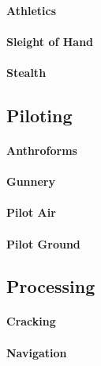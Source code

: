 \paragraph{Athletics}

\paragraph{Sleight of Hand}

\paragraph{Stealth}


\subsection{Piloting}

\paragraph{Anthroforms}

\paragraph{Gunnery}

\paragraph{Pilot Air}

\paragraph{Pilot Ground}

\subsection{Processing}

\paragraph{Cracking}

\paragraph{Navigation}

